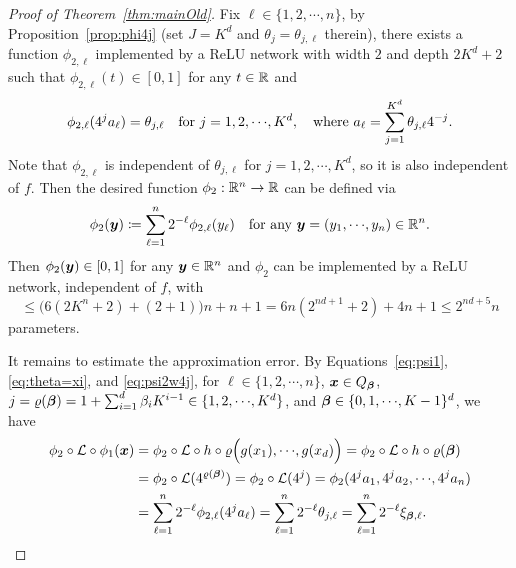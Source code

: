 \documentclass[nohyperref]{article}
\theoremstyle{plain}
\theoremstyle{definition}
\theoremstyle{remark}
\begin{document}
\begin{proof}[Proof of Theorem~\ref{thm:mainOld}]
	
	Fix $\ell\in \{1,2,\cdots,n\}$, by Proposition~\ref{prop:phi4j} (set $J=K^d$ and $\theta_j=\theta_{j,\ell}$ therein), 
	there exists a function $\phi_{2,\ell}$ implemented by a ReLU network with width $2$ and depth $2K^d+2$ such that $\phi_{2,\ell}(t)\in [0,1]$ for any $t\in \R$ and
	\begin{equation}
		\label{eq:psi2w4j}
		\phi_{2,\ell}(4^ja_\ell)=\theta_{j,\ell}\quad \tn{for $j=1,2,\cdots,K^d$},\quad \tn{where}\ a_\ell=\sum_{j=1}^{K^d} \theta_{j,\ell}4^{-j}.
	\end{equation}
	Note that $\phi_{2,\ell}$ is independent of $\theta_{j,\ell}$ for $j=1,2,\cdots,K^d$, so it is also independent of $f$. Then the desired function $\phi_2:\R^n\to \R$ can be defined via
	\begin{equation*}
		\phi_2(\bmy)\coloneqq \sum_{\ell=1}^{n}2^{-\ell}\phi_{2,\ell}(y_\ell)\quad \tn{for any $\bmy=(y_1,\cdots,y_n)\in \R^n$.}
	\end{equation*}
	Then $\phi_{2}({\bm{y}})\in [0,1]$ for any $\bmy\in \R^n$ and
	$\phi_{2}$ can be implemented by a ReLU network, independent of $f$,  with \[\le \Big(6(2K^n+2)+(2+1)\Big)n+n+1=6n(2^{nd+1}+2)+4n+1\le 2^{nd+5}n \] parameters.%
	
	It  remains to estimate the approximation error. By Equations~\eqref{eq:psi1}, \eqref{eq:theta=xi}, and \eqref{eq:psi2w4j}, for  $\ell\in \{1,2,\cdots,n\}$, ${\bm{x}}\in Q_{\bm{\beta}}$, $j=\varrho(\bmbeta)=1+\sum_{i=1}^d \beta_i K^{i-1}\in \{1,2,\cdots,K^d\}$, and $\bmbeta\in \{0,1,\cdots,K-1\}^d$, we have
	\begin{equation*}
		\begin{split}
			\phi_2\circ \calL\circ \phi_1(\bmx)&=\phi_2\circ \calL\circ h\circ \varrho\Big(g(x_1),\cdots,g(x_d)\Big)=\phi_2\circ \calL\circ h\circ \varrho(\bmbeta)\\
			&= \phi_2\circ \calL(4^{\varrho(\bmbeta)})
			=\phi_2\circ \calL(4^j)
			= \phi_2(4^ja_1,4^ja_2,\cdots,4^ja_n)\\
			&=\sum_{\ell=1}^{n}2^{-\ell}\phi_{2,\ell}(4^ja_\ell)
			= \sum_{\ell=1}^{n}2^{-\ell}\theta_{j,\ell}
			=\sum_{\ell=1}^{n}2^{-\ell}\xi_{\bmbeta,\ell}.
		\end{split}
	\end{equation*}
	

\end{proof}
\end{document}
